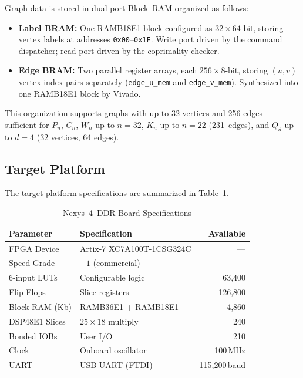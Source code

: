 \documentclass[lettersize,journal]{IEEEtran}
\begin{document}
Graph data is stored in dual-port Block~RAM organized as follows:
\begin{itemize}
\item \textbf{Label BRAM:} One RAMB18E1 block configured as $32 \times 64$-bit, storing vertex labels at addresses \texttt{0x00}--\texttt{0x1F}. Write port driven by the command dispatcher; read port driven by the coprimality checker.
\item \textbf{Edge BRAM:} Two parallel register arrays, each $256 \times 8$-bit, storing $(u, v)$ vertex index pairs separately (\texttt{edge\_u\_mem} and \texttt{edge\_v\_mem}). Synthesized into one RAMB18E1 block by Vivado.
\end{itemize}

This organization supports graphs with up to 32 vertices and 256 edges---sufficient for $P_n$, $C_n$, $W_n$ up to $n = 32$, $K_n$ up to $n = 22$ (231~edges), and $Q_d$ up to $d = 4$ (32 vertices, 64 edges).

\subsection{Target Platform}

The target platform specifications are summarized in Table~\ref{tab:board}.

\begin{table}[!t]
\caption{Nexys~4~DDR Board Specifications\label{tab:board}}
\centering
\begin{tabular}{@{}llr@{}}
\toprule
\textbf{Parameter} & \textbf{Specification} & \textbf{Available} \\
\midrule
FPGA Device        & Artix-7 XC7A100T-1CSG324C & --- \\
Speed Grade        & $-1$ (commercial)          & --- \\
6-input LUTs       & Configurable logic         & 63{,}400 \\
Flip-Flops         & Slice registers            & 126{,}800 \\
Block RAM (Kb)     & RAMB36E1 + RAMB18E1        & 4{,}860 \\
DSP48E1 Slices     & $25 \times 18$ multiply    & 240 \\
Bonded IOBs        & User I/O                   & 210 \\
Clock              & Onboard oscillator         & 100\,MHz \\
UART               & USB-UART (FTDI)            & 115{,}200\,baud \\
\bottomrule
\end{tabular}
\end{table}
\end{document}
